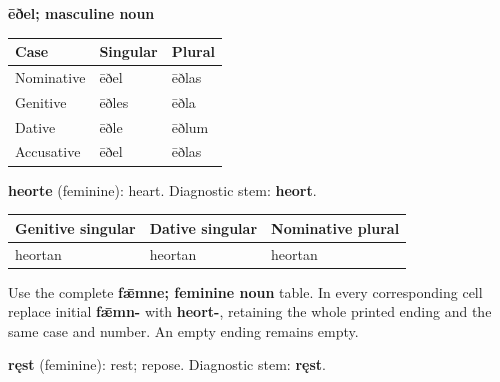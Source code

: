\textbf{ēðel; masculine noun}

\par\begingroup
\fontsize{10.5}{13.2}\selectfont
\setlength{\LTleft}{0pt}\setlength{\LTright}{\fill}
\noindent
\begin{tabular}{@{}>{\raggedright\arraybackslash}p{39.46mm}>{\raggedright\arraybackslash}p{39.46mm}>{\raggedright\arraybackslash}p{39.46mm}@{}}
\toprule
\textbf{Case} & \textbf{Singular} & \textbf{Plural} \\
\midrule
Nominative & ēðel & ēðlas \\
Genitive & ēðles & ēðla \\
Dative & ēðle & ēðlum \\
Accusative & ēðel & ēðlas \\
\bottomrule
\end{tabular}
\par\endgroup

\textbf{heorte} (feminine): heart. Diagnostic stem: \textbf{heort}.

\par\begingroup
\fontsize{10.5}{13.2}\selectfont
\setlength{\LTleft}{0pt}\setlength{\LTright}{\fill}
\noindent
\begin{tabular}{@{}>{\raggedright\arraybackslash}p{39.24mm}>{\raggedright\arraybackslash}p{36.31mm}>{\raggedright\arraybackslash}p{42.82mm}@{}}
\toprule
\textbf{Genitive singular} & \textbf{Dative singular} & \textbf{Nominative plural} \\
\midrule
heortan & heortan & heortan \\
\bottomrule
\end{tabular}
\par\endgroup

Use the complete \textbf{fǣmne; feminine noun} table. In every corresponding cell replace initial \textbf{fǣmn-} with \textbf{heort-}, retaining the whole printed ending and the same case and number. An empty ending remains empty.

\textbf{ręst} (feminine): rest; repose. Diagnostic stem: \textbf{ręst}.


